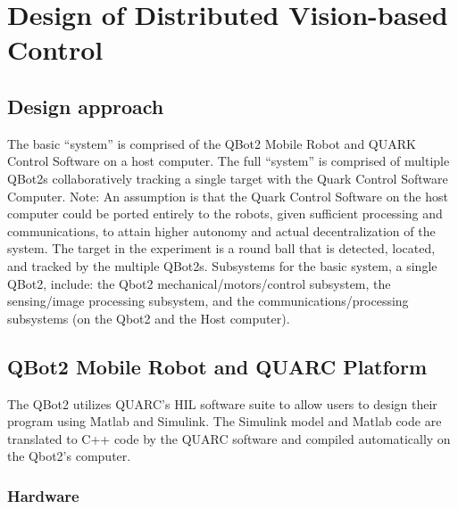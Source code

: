 \documentclass[conference]{IEEEtran}
\begin{document}
\section{Design of Distributed Vision-based Control}


\subsection{Design approach}

The basic “system” is comprised of the QBot2 Mobile Robot and QUARK Control Software on a host computer.  The full “system” is comprised of multiple QBot2s collaboratively tracking a single target with the Quark Control Software Computer.  Note: An assumption is that the Quark Control Software on the host computer could be ported entirely to the robots, given sufficient processing and communications, to attain higher autonomy and actual decentralization of the system.  The target in the experiment is a round ball that is detected, located, and tracked by the multiple QBot2s.    
Subsystems for the basic system, a single QBot2, include: the Qbot2 mechanical/motors/control subsystem, the sensing/image processing subsystem, and the communications/processing subsystems (on the Qbot2 and the Host computer). 

\subsection{QBot2 Mobile Robot and QUARC Platform}

The QBot2 utilizes QUARC’s HIL software suite to allow users to design their program using Matlab and Simulink.  The Simulink model and Matlab code are translated to C++ code by the QUARC software and compiled automatically on the Qbot2’s computer.

\subsubsection{Hardware}
\end{document}
